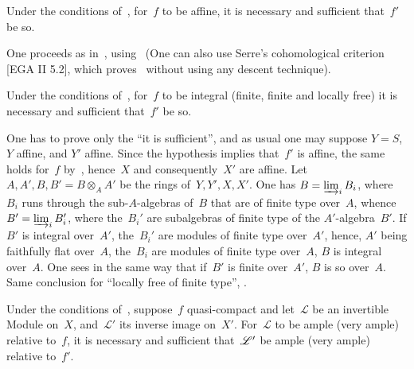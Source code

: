 \begin{corollary}
\label{VIII.5.6}
Under the conditions of~, for~$f$ to be affine, it
is necessary and sufficient that~$f'$ be so.
\end{corollary}

One proceeds as in~, using~
(One can also use Serre's cohomological criterion [EGA II
5.2], which proves~ without using any descent
technique).

\begin{corollary}
\label{VIII.5.7}
Under the conditions of~, for~$f$ to be integral
(\resp finite, \resp finite and locally free) it is necessary and sufficient
that~$f'$ be so.
\end{corollary}

One has to prove only the ``it is sufficient'', and as usual
one may suppose $Y=S$, $Y$ affine, and $Y'$ affine. Since
the hypothesis implies that~$f'$ is affine, the same holds
for~$f$ by~, hence~$X$ and consequently~$X'$ are
affine. Let~$A,A',B,B'=B\otimes_{A}A'$ be the rings
of~$Y,Y',X,X'$. One has $B=\varinjlim_i B_{i}$, where~$B_{i}$
runs through the sub-$A$-algebras of~$B$ that are of finite type
over~$A$, whence $B'=\varinjlim_i B_{i}'$, where
the~$B_{i}'$ are subalgebras of finite type of the
$A'$-algebra~$B'$. If $B'$ is integral
over~$A'$,
the~$B_{i}'$ are modules of finite type over~$A'$, hence, $A'$
being faithfully flat over~$A$, the~$B_{i}$ are modules of
finite type over~$A$, \ie $B$ is integral over~$A$. One sees in the same way
that if~$B'$ is finite over~$A'$, $B$ is so over~$A$. Same conclusion
for ``locally free of finite type'', \cf {}.

\begin{corollary}
\label{VIII.5.8}
Under
the conditions of~, suppose~$f$ quasi-compact and
let~$\mathcal{L}$ be an invertible Module on~$X$, and~$\mathcal{L}'$
its inverse image on~$X'$. For~$\mathcal{L}$ to be ample
(\resp very ample) relative to~$f$, it is necessary and sufficient
that~$\cal{L}'$
be ample (\resp very ample) relative to~$f'$.
\end{corollary}

